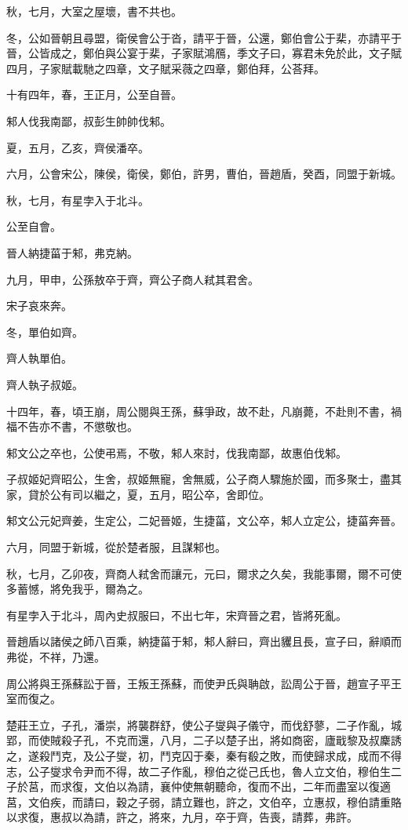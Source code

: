 \begin{pinyinscope}
秋，七月，大室之屋壞，書不共也。

冬，公如晉朝且尋盟，衛侯會公于沓，請平于晉，公還，鄭伯會公于棐，亦請平于晉，公皆成之，鄭伯與公宴于棐，子家賦鴻鴈，季文子曰，寡君未免於此，文子賦四月，子家賦載馳之四章，文子賦采薇之四章，鄭伯拜，公荅拜。

十有四年，春，王正月，公至自晉。

邾人伐我南鄙，叔彭生帥帥伐邾。

夏，五月，乙亥，齊侯潘卒。

六月，公會宋公，陳侯，衛侯，鄭伯，許男，曹伯，晉趙盾，癸酉，同盟于新城。

秋，七月，有星孛入于北斗。

公至自會。

晉人納捷菑于邾，弗克納。

九月，甲申，公孫敖卒于齊，齊公子商人弒其君舍。

宋子哀來奔。

冬，單伯如齊。

齊人執單伯。

齊人執子叔姬。

十四年，春，頃王崩，周公閱與王孫，蘇爭政，故不赴，凡崩薨，不赴則不書，禍福不告亦不書，不懲敬也。

邾文公之卒也，公使弔焉，不敬，邾人來討，伐我南鄙，故惠伯伐邾。

子叔姬妃齊昭公，生舍，叔姬無寵，舍無威，公子商人驟施於國，而多聚士，盡其家，貸於公有司以繼之，夏，五月，昭公卒，舍即位。

邾文公元妃齊姜，生定公，二妃晉姬，生捷菑，文公卒，邾人立定公，捷菑奔晉。

六月，同盟于新城，從於楚者服，且謀邾也。

秋，七月，乙卯夜，齊商人弒舍而讓元，元曰，爾求之久矣，我能事爾，爾不可使多蓄憾，將免我乎，爾為之。

有星孛入于北斗，周內史叔服曰，不出七年，宋齊晉之君，皆將死亂。

晉趙盾以諸侯之師八百乘，納捷菑于邾，邾人辭曰，齊出貜且長，宣子曰，辭順而弗從，不祥，乃還。

周公將與王孫蘇訟于晉，王叛王孫蘇，而使尹氏與聃啟，訟周公于晉，趙宣子平王室而復之。

楚莊王立，子孔，潘崇，將襲群舒，使公子燮與子儀守，而伐舒蓼，二子作亂，城郢，而使賊殺子孔，不克而還，八月，二子以楚子出，將如商密，廬戢黎及叔麇誘之，遂殺鬥克，及公子燮，初，鬥克囚于秦，秦有殽之敗，而使歸求成，成而不得志，公子燮求令尹而不得，故二子作亂，穆伯之從己氏也，魯人立文伯，穆伯生二子於莒，而求復，文伯以為請，襄仲使無朝聽命，復而不出，二年而盡室以復適莒，文伯疾，而請曰，穀之子弱，請立難也，許之，文伯卒，立惠叔，穆伯請重賂以求復，惠叔以為請，許之，將來，九月，卒于齊，告喪，請葬，弗許。


\end{pinyinscope}
